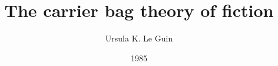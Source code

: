



\graphicspath{
    {resources/}
}

\geometry{   
    a5paper,
    left=.75in,
    right=.75in,
    top=1in,
    bottom=1in
}

\newcommand{\theauthor}{ 
    Ursula K. Le Guin
}
\newcommand{\theoriginaltitle}{
    The carrier bag theory of fiction
}
\newcommand{\thetitle}{
    La Teoría de la Bolsa de \\ 
    Transporte de la Ficción
}
\newcommand{\thesubtitle}{
    en inglés y español
}
\newcommand{\thedate}{
    1985
}

\title{\theoriginaltitle}
\author{\theauthor}
\date{\thedate}



    \setlength\parindent{0pt}   %
    \setlength{\parskip}{0.75em}   %
    
    
    
    
    
    
    
    
    
    
    \blankpage
    
    
    

